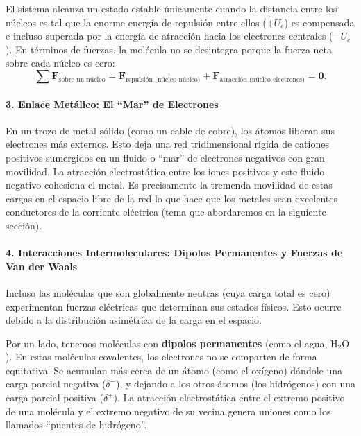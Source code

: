 \documentclass[11pt,a4paper]{book}
\begin{document}
El sistema alcanza un estado estable únicamente cuando la distancia entre los núcleos es tal que la enorme energía de repulsión entre ellos ($+U_e$) es compensada e incluso superada por la energía de atracción hacia los electrones centrales ($-U_e$). En términos de fuerzas, la molécula no se desintegra porque la fuerza neta sobre cada núcleo es cero:
\begin{equation}
    \sum \boldsymbol{F}_{\text{sobre un núcleo}} = \boldsymbol{F}_{\text{repulsión (núcleo-núcleo)}} + \boldsymbol{F}_{\text{atracción (núcleo-electrones)}} = \boldsymbol{0}.
\end{equation}

\paragraph{3. Enlace Metálico: El ``Mar'' de Electrones}
En un trozo de metal sólido (como un cable de cobre), los átomos liberan sus electrones más externos. Esto deja una red tridimensional rígida de cationes positivos sumergidos en un fluido o ``mar'' de electrones negativos con gran movilidad. La atracción electrostática entre los iones positivos y este fluido negativo cohesiona el metal. Es precisamente la tremenda movilidad de estas cargas en el espacio libre de la red lo que hace que los metales sean excelentes conductores de la corriente eléctrica (tema que abordaremos en la siguiente sección).

\paragraph{4. Interacciones Intermoleculares: Dipolos Permanentes y Fuerzas de Van der Waals}

Incluso las moléculas que son globalmente neutras (cuya carga total es cero) experimentan fuerzas eléctricas que determinan sus estados físicos. Esto ocurre debido a la distribución asimétrica de la carga en el espacio.

Por un lado, tenemos moléculas con \textbf{dipolos permanentes} (como el agua, $\text{H}_2\text{O}$). En estas moléculas covalentes, los electrones no se comparten de forma equitativa. Se acumulan más cerca de un átomo (como el oxígeno) dándole una carga parcial negativa ($\delta^-$), y dejando a los otros átomos (los hidrógenos) con una carga parcial positiva ($\delta^+$). La atracción electrostática entre el extremo positivo de una molécula y el extremo negativo de su vecina genera uniones como los llamados ``puentes de hidrógeno''.
\end{document}
